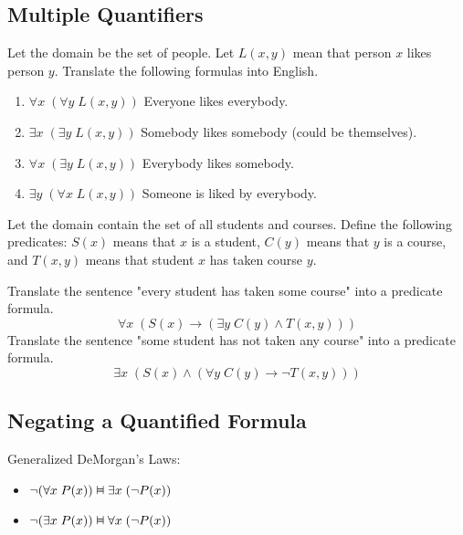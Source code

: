 \documentclass[11pt]{article}
\theoremstyle{definition}
\newcommand{\vDashv}{%
  \mathrel{%
    \text{%
      \ooalign{$\vDash$\cr\reflectbox{$\vDash$}\cr}%
    }%
  }%
}
\begin{document}
\subsection{Multiple Quantifiers}
Let the domain be the set of people. Let $L(x, y)$ mean that person $x$ likes person $y$. Translate the following formulas into English.\vspace{-0.25cm}
\begin{enumerate}
    \item $\forall x \; (\forall y \; L(x,y))$ \quad Everyone likes everybody.
    \item $\exists x \; (\exists y \; L(x,y))$ \quad Somebody likes somebody (could be themselves).
    \item $\forall x \; (\exists y \; L(x,y))$ \quad Everybody likes somebody.
    \item $\exists y \; (\forall x \; L(x,y))$ \quad Someone is liked by everybody.
\end{enumerate}
\vspace{-0.25cm}
Let the domain contain the set of all students and courses. Define the following predicates: $S(x)$ means that $x$ is a student, $C(y)$ means that $y$ is a course, and $T(x,y)$ means that student $x$ has taken course $y$.

Translate the sentence "every student has taken some course" into a predicate formula. 
$$\forall x \; (S(x) \rightarrow (\exists y \; C(y) \wedge T(x,y)))$$
Translate the sentence "some student has not taken any course" into a predicate formula.
$$\exists x \; (S(x) \wedge (\forall y \; C(y) \rightarrow \neg T(x,y)))$$

\subsection{Negating a Quantified Formula}
Generalized DeMorgan's Laws: \vspace{-0.25cm}
\begin{itemize}
    \item $\neg (\forall x \; P(x)) \vDashv \exists x \; (\neg P(x))$
    \item $\neg (\exists x \; P(x)) \vDashv \forall x \; (\neg P(x))$
\end{itemize}
\end{document}
